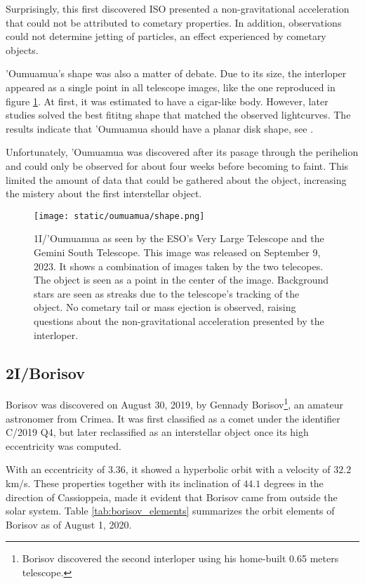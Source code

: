 Surprisingly, this first discovered ISO presented a non-gravitational
acceleration that could not be attributed to cometary properties. In addition,
observations could not determine jetting of particles, an effect experienced by
cometary objects.

'Oumuamua's shape was also a matter of debate. Due to its size, the interloper
appeared as a single point in all telescope images, like the one reproduced in
figure \ref{fig:oumuamua_shape}. At first, it was estimated to have a cigar-like
body. However, later studies solved the best fititng shape that matched the
observed lightcurves. The results indicate that 'Oumuamua should have a planar
disk shape, see \cite{seligman2022}.

Unfortunately, 'Oumuamua was discovered after its pasage through the perihelion
and could only be observed for about four weeks before becoming to faint. This
limited the amount of data that could be gathered about the object, increasing
the mistery about the first interstellar object.

\begin{figure}[H]
  \centering
  \texttt{[image: static/oumuamua/shape.png]}
\caption['Oumuamua as seen by the ESO's Very Large Telescope and the Gemini South Telescope]{
  1I/'Oumuamua as seen by the ESO's Very Large Telescope and the Gemini South Telescope. This image was
  released on September 9, 2023. It shows a combination of images taken by the two
  telecopes. The object is seen as a point in the center of the image. Background
  stars are seen as streaks due to the telescope's tracking of the object. No
  cometary tail or mass ejection is observed, raising questions about the non-gravitational
  acceleration presented by the interloper.
  }
  \label{fig:oumuamua_shape}
\end{figure}

\subsection{2I/Borisov}

Borisov was discovered on August 30, 2019, by Gennady Borisov\footnote{Borisov
discovered the second interloper using his home-built 0.65 meters
telescope.}, an amateur astronomer from Crimea. It was first classified as
a comet under the identifier C/2019 Q4, but later reclassified as an
interstellar object once its high eccentricity was computed.

With an eccentricity of $3.36$, it showed a hyperbolic orbit with a velocity of
$32.2$ km/s. These properties together with its inclination of $44.1$ degrees in
the direction of Cassioppeia, made it evident that Borisov came from outside the
solar system. Table \ref{tab:borisov_elements} summarizes the orbit elements of
Borisov as of August 1, 2020.

